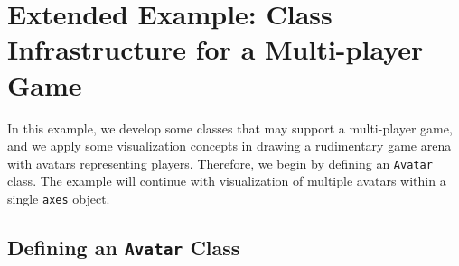 \section{Extended Example: Class Infrastructure for a Multi-player Game}

In this example, we develop some classes that may support a multi-player game, and we apply some visualization concepts in drawing a rudimentary game arena with avatars representing players. Therefore, we begin by defining an \texttt{Avatar} class. The example will continue with visualization of multiple avatars within a single \texttt{axes} object.

\subsection{Defining an \texttt{Avatar} Class}

